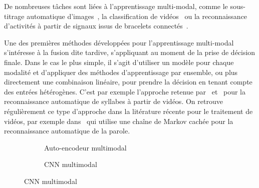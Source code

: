 De nombreuses tâches sont liées à l'apprentissage multi-modal, comme le sous-titrage automatique d'images~\cite{karpathy_deep_2015}, la classification de vidéos~\cite{kim_deep_2013} ou la reconnaissance d'activités à partir de signaux issus de bracelets connectés~\cite{ordonez_deep_2016}.

Une des premières méthodes développées pour l'apprentissage multi-modal s'intéresse à la fusion dite tardive, s'appliquant au moment de la prise de décision finale. Dans le cas le plus simple, il s'agit d'utiliser un modèle pour chaque modalité et d'appliquer des méthodes d'apprentissage par ensemble, ou plus directement une combinaison linéaire, pour prendre la décision en tenant compte des entrées hétérogènes. C'est par exemple l'approche retenue par~\citet{yuhas_integration_1989} et~\citet{meier_adaptive_1996} pour la reconnaissance automatique de syllabes à partir de vidéos. On retrouve régulièrement ce type d'approche dans la litérature récente pour le traitement de vidéos, par exemple dans~\cite{noda_audio-visual_2015} qui utilise une chaîne de Markov cachée pour la reconnaissance automatique de la parole.

\begin{figure}
  \hfill
  \begin{subfigure}[b]{0.43\textwidth}
    \resizebox{\textwidth}{!}{
      
    }
    \caption{Auto-encodeur multimodal~\cite{ngiam_multimodal_2011}}
    \label{fig:ae_multimodal}
  \end{subfigure}%
  \hfill
  \begin{subfigure}[b]{0.53\textwidth}
    \resizebox{\textwidth}{!}{
      
    }
    \caption{\gls{CNN} multimodal~\cite{eitel_multimodal_2015}}
    \label{fig:cnn_multimodal}
  \end{subfigure}
  \hfill
\end{figure}

